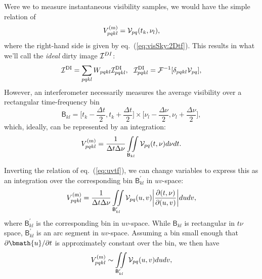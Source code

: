 \documentclass[useAMS,usenatbib]{mn2e}
\begin{document}
Were we to measure instantaneous visibility samples, we would have the simple relation of
\begin{equation}
V^\mathrm{(m)}_{pqkl}  = \mathcal{V}_{pq}(t_k,\nu_l),
\end{equation}
where the right-hand side is given by eq.~(\ref{eq:visSky:2Dtf}). This results in what we'll call the \emph{ideal} dirty image 
$\mathcal{I}^{DI}$:
\begin{equation}
\label{eq:imaging:DI}
\mathcal{I}^\mathrm{DI} =  \sum_{pqkl} W_{pqkl} \mathcal{I}^\mathrm{DI}_{pqkl},~~
\mathcal{I}^\mathrm{DI}_{pqkl} =  \mathcal{F}^{-1}[ \delta_{pqkl}\mathcal{V}_{pq} ],
\end{equation}
However, an interferometer necessarily measures the
average visibility over a rectangular time-frequency bin 
\begin{equation}
\mathsf{B}_{kl} = \bigg [ t_k-\frac{\Delta t}{2},t_k+\frac{\Delta t}{2} \bigg ]
\times
\bigg [ \nu_l-\frac{\Delta\nu}{2},\nu_l+\frac{\Delta\nu}{2} \bigg ],  
\end{equation}
which, ideally, can be represented by an integration:
\begin{equation}
V^\mathrm{(m)}_{pqkl} = \frac{1}{\Delta t \Delta \nu} 
\iint\limits_{\mathsf{B}_{kl}}
\mathcal{V}_{pq}(t,\nu)d\nu dt.
\label{eq2:conti}
\end{equation}

Inverting the relation of eq.~(\ref{eq:uvtf}), we can change variables to express this as an integration over the 
corresponding bin $\mathsf{B}^{\prime}_{kl}$ in $uv$-space:
\begin{equation}
V^\mathrm{(m)}_{pqkl} = \frac{1}{\Delta t \Delta \nu} 
\iint\limits_{\mathsf{B}^{\prime}_{kl}}
\mathcal{V}_{pq}(u,v)\bigg| \frac{\partial(t,\nu)}{\partial(u,v)}\bigg| dudv,
\label{eq2:conti:uv}
\end{equation}
where $\mathsf{B}^{\prime}_{kl}$ is the corresponding bin in $uv$-space. While $\mathsf{B}_{kl}$ is rectangular in $t\nu$ space, 
$\mathsf{B}^{\prime}_{kl}$ is an arc segment in $uv$-space. Assuming a bin small enough that 
$\partial\bmath{u}/\partial t$ is approximately constant over the bin, we then have
\begin{equation}
V^\mathrm{(m)}_{pqkl} \sim \iint\limits_{\mathsf{B}^{\prime}_{kl}}
\mathcal{V}_{pq}(u,v) dudv,
\label{eq2:conti:uv1}
\end{equation}

\end{document}
